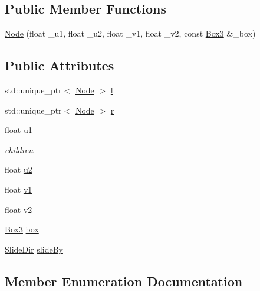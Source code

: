 \subsection*{Public Member Functions}
\begin{DoxyCompactItemize}
\item 
\hyperlink{structBoxTree_1_1Node_a9b631d5d7dd608857dbf6b16407b1e0a}{Node} (float \+\_\+u1, float \+\_\+u2, float \+\_\+v1, float \+\_\+v2, const \hyperlink{structBox3}{Box3} \&\+\_\+box)
\end{DoxyCompactItemize}
\subsection*{Public Attributes}
\begin{DoxyCompactItemize}
\item 
std\+::unique\+\_\+ptr$<$ \hyperlink{structBoxTree_1_1Node}{Node} $>$ \hyperlink{structBoxTree_1_1Node_a9d101fa1093b0c23cbff294f65c0a04b}{l}
\item 
std\+::unique\+\_\+ptr$<$ \hyperlink{structBoxTree_1_1Node}{Node} $>$ \hyperlink{structBoxTree_1_1Node_a8e85cff13a1049196ff4457654c9fa33}{r}
\item 
float \hyperlink{structBoxTree_1_1Node_ab92350a00f11c1d1f7c7c076029bfa65}{u1}
\begin{DoxyCompactList}\small\item\em children \end{DoxyCompactList}\item 
float \hyperlink{structBoxTree_1_1Node_a5f00089be77fb8baf47bde296a491a5b}{u2}
\item 
float \hyperlink{structBoxTree_1_1Node_a6776d4995a710d07a91c8ce29d6ca8e8}{v1}
\item 
float \hyperlink{structBoxTree_1_1Node_a00397c546d573ed0018f43b714414303}{v2}
\item 
\hyperlink{structBox3}{Box3} \hyperlink{structBoxTree_1_1Node_a0926dd1c5b248667de3399a08bf6bc6f}{box}
\item 
\hyperlink{structBoxTree_1_1Node_af862522c79bbea75bbbfa47614842295}{Slide\+Dir} \hyperlink{structBoxTree_1_1Node_a23938b7d422df4c0faebd8fe0af43bd3}{slide\+By}
\end{DoxyCompactItemize}


\subsection{Member Enumeration Documentation}
